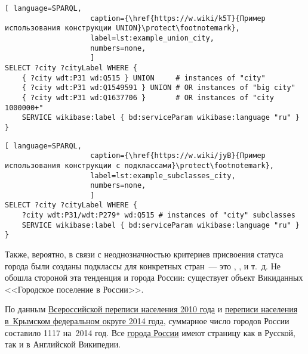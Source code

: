 \begin{lstlisting}[ language=SPARQL, 
                    caption={\href{https://w.wiki/k5T}{Пример использования конструкции UNION}\protect\footnotemark},
                    label=lst:example_union_city,
                    numbers=none,
                    ]
SELECT ?city ?cityLabel WHERE {
    { ?city wdt:P31 wd:Q515 } UNION     # instances of "city"            
    { ?city wdt:P31 wd:Q1549591 } UNION # OR instances of "big city"               
    { ?city wdt:P31 wd:Q1637706 }       # OR instances of "city 1000000+"
    SERVICE wikibase:label { bd:serviceParam wikibase:language "ru" }
}
\end{lstlisting}




\newpage
\begin{lstlisting}[ language=SPARQL, 
                    caption={\href{https://w.wiki/jyB}{Пример использования конструкции с подклассами}\protect\footnotemark},
                    label=lst:example_subclasses_city,
                    numbers=none,
                    ]
SELECT ?city ?cityLabel WHERE {
    ?city wdt:P31/wdt:P279* wd:Q515 # instances of "city" subclasses
    SERVICE wikibase:label { bd:serviceParam wikibase:language "ru" }
}
\end{lstlisting}

Также, вероятно, в связи с неоднозначностью критериев присвоения статуса города 
были созданы подклассы для конкретных стран~--- это , 
,  и т.~д. 
Не обошла стороной эта тенденция и города России: 
существует объект Викиданных <<Городское поселение в России>>.


По данным \href{https://bit.ly/2JPL34b}{Всероссийской переписи населения 2010 года}\autocite{city_perepis_2010} 
и \href{https://bit.ly/2Lflc6F}{переписи населения в~Крымском федеральном округе 2014 года}\autocite{city_perepis_2014}, 
суммарное число городов России составило \num{1117} на~2014 год. 
Все \href{https://w.wiki/oLE}{города России} имеют страницу как в Русской, так и в Английской Википедии.

